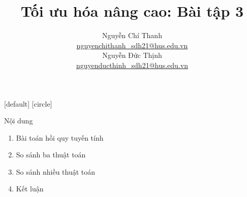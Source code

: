 \documentclass[10pt]{beamer}
\title[Tối ưu hóa nâng cao]{Tối ưu hóa nâng cao: Bài tập 3}
\theoremstyle{remark}
\theoremstyle{definition}
\begin{document}
\nocite{*}

\author[Nguyễn Chí Thanh - Nguyễn Đức Thịnh]{
	\begin{tabular}{c} 
	\Large
	Nguyễn Chí Thanh \\
    \footnotesize \href{mailto:nguyenchithanh\_sdh21@hus.edu.vn}{nguyenchithanh\_sdh21@hus.edu.vn} \\
	\Large
    Nguyễn Đức Thịnh \\
     \footnotesize \href{mailto:nguyenducthinh\_sdh21@hus.edu.vn}{nguyenducthinh\_sdh21@hus.edu.vn}
\end{tabular}
\vspace{-4ex}}


\begin{noheadline}
\begin{frame} \maketitle \end{frame}
\end{noheadline}
    
[default]
[circle]

\begin{frame}{Nội dung}

    \begin{enumerate}
		\item Bài toán hồi quy tuyến tính
        \item So sánh ba thuật toán
        \item So sánh nhiều thuật toán
        \item Kết luận
    \end{enumerate}
    
\end{frame}
\end{document}
